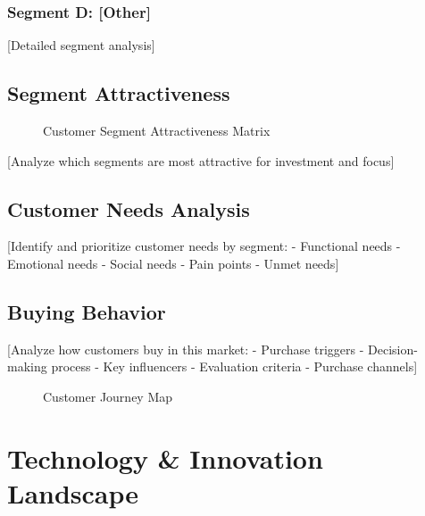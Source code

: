 \documentclass[11pt,letterpaper]{report}
\begin{document}
\subsection{Segment D: [Other]}
[Detailed segment analysis]

\section{Segment Attractiveness}


\begin{figure}[htbp]
\centering
\caption{Customer Segment Attractiveness Matrix}
\label{fig:segment_attractiveness}
\end{figure}

[Analyze which segments are most attractive for investment and focus]

\section{Customer Needs Analysis}

[Identify and prioritize customer needs by segment:
- Functional needs
- Emotional needs
- Social needs
- Pain points
- Unmet needs]

\section{Buying Behavior}

[Analyze how customers buy in this market:
- Purchase triggers
- Decision-making process
- Key influencers
- Evaluation criteria
- Purchase channels]


\begin{figure}[htbp]
\centering
\caption{Customer Journey Map}
\label{fig:customer_journey}
\end{figure}

\chapter{Technology \& Innovation Landscape}
\end{document}
